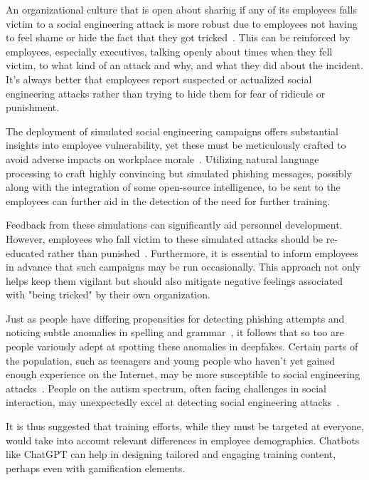 An organizational culture that is open about sharing if any of its employees falls victim to a social engineering attack is more robust due to employees not having to feel shame or hide the fact that they got tricked~\citep{hadnagy_Social_Engineering_The_Science_2018}. This can be reinforced by employees, especially executives, talking openly about times when they fell victim, to what kind of an attack and why, and what they did about the incident. It's always better that employees report suspected or actualized social engineering attacks rather than trying to hide them for fear of ridicule or punishment.

The deployment of simulated social engineering campaigns offers substantial insights into employee vulnerability, yet these must be meticulously crafted to avoid adverse impacts on workplace morale~\citep{mitnick_The_Art_of_Deception_2003}. Utilizing natural language processing to craft highly convincing but simulated phishing messages, possibly along with the integration of some open-source intelligence, to be sent to the employees can further aid in the detection of the need for further training.

Feedback from these simulations can significantly aid personnel development. However, employees who fall victim to these simulated attacks should be re-educated rather than punished~\citep{mitnick_The_Art_of_Deception_2003}. Furthermore, it is essential to inform employees in advance that such campaigns may be run occasionally. This approach not only helps keep them vigilant but should also mitigate negative feelings associated with "being tricked" by their own organization.

%
%
Just as people have differing propensities for detecting phishing attempts and noticing subtle anomalies in spelling and grammar~\citep{nicholson_Investigating_Teenagers_Detect_Phishing_2020, neupane_Social_Disorders_Facilitate_SE_2018}, it follows that so too are people variously adept at spotting these anomalies in deepfakes. Certain parts of the population, such as teenagers and young people who haven't yet gained enough experience on the Internet, may be more susceptible to social engineering attacks~\citep{nicholson_Investigating_Teenagers_Detect_Phishing_2020}. People on the autism spectrum, often facing challenges in social interaction, may unexpectedly excel at detecting social engineering attacks~\citep{neupane_Social_Disorders_Facilitate_SE_2018}.

It is thus suggested that training efforts, while they must be targeted at everyone, would take into account relevant differences in employee demographics. Chatbots like ChatGPT can help in designing tailored and engaging training content, perhaps even with gamification elements.


